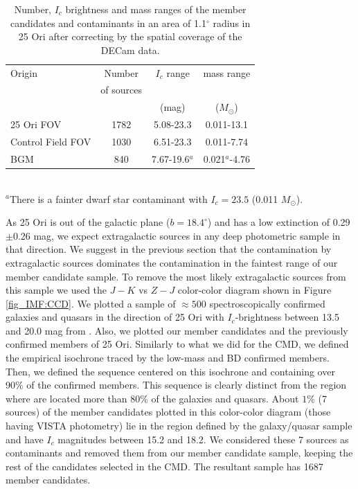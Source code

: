 \documentclass[12pt]{article}
\newcounter{subsubsubsection}[subsubsection]
\begin{document}
\begin{table}
\caption[Number of member candidates and contaminants in our sample.]{Number, $I_c$ brightness and mass ranges of the member candidates and contaminants in an area of 1.1$^\circ$ radius in 25 Ori after correcting by the spatial coverage of the DECam data.}
	\small
	\label{tab_IMF:candidates}
    \setlength{\tabcolsep}{12pt}
	\begin{center}
 	\begin{tabular}{@{}lccc}
    \toprule
 	Origin  	       & Number            & $I_c$ range  & mass range \\ \vspace{-.05in}
					   & of sources        &              &            \\
 	    	   		   & 	        	   & (mag)        & ($M_\odot$)\\
    \midrule
 	25 Ori FOV         & 1782	  		   & 5.08-23.3    & 0.011-13.1   \\
 	Control Field FOV  & 1030 	  		   & 6.51-23.3    & 0.011-7.74     \\ 
 	BGM                & 840   	  		   & 7.67-19.6$^a$& 0.021$^a$-4.76 \\ 
    \bottomrule
 	\end{tabular}\\
	$^a$There is a fainter dwarf star contaminant with $I_c=23.5$ (0.011 $M_\odot$).
	\end{center}
\end{table}

\label{sec_IMF:extgalcontam}
As 25 Ori is out of the galactic plane ($b=18.4^\circ$) and has a low extinction of 0.29$\pm$0.26 mag, we expect extragalactic sources in any deep photometric sample in that direction. We suggest in the previous section that the contamination by extragalactic sources dominates the contamination in the faintest range of our member candidate sample. To remove the most likely extragalactic sources from this sample we used the $J-K$ vs $Z-J$ color-color diagram shown in Figure \ref{fig_IMF:CCD}. We plotted a sample of $\approx 500$ spectroscopically confirmed galaxies and quasars in the direction of 25 Ori with $I_c$-brightness between 13.5 and 20.0 mag from \cite{Suarez2017}. Also, we plotted our member candidates and the previously confirmed members of 25 Ori. Similarly to what we did for the CMD, we defined the empirical isochrone traced by the low-mass and BD confirmed members. Then, we defined the sequence centered on this isochrone and containing over 90\% of the confirmed members. This sequence is clearly distinct from the region where are located more than $80$\% of the galaxies and quasars. About $1$\% (7 sources) of the member candidates plotted in this color-color diagram (those having VISTA photometry) lie in the region defined by the galaxy/quasar sample and have $I_c$ magnitudes between 15.2 and 18.2. We considered these 7 sources as contaminants and removed them from our member candidate sample, keeping the rest of the candidates selected in the CMD. The resultant sample has 1687 member candidates.
\end{document}
